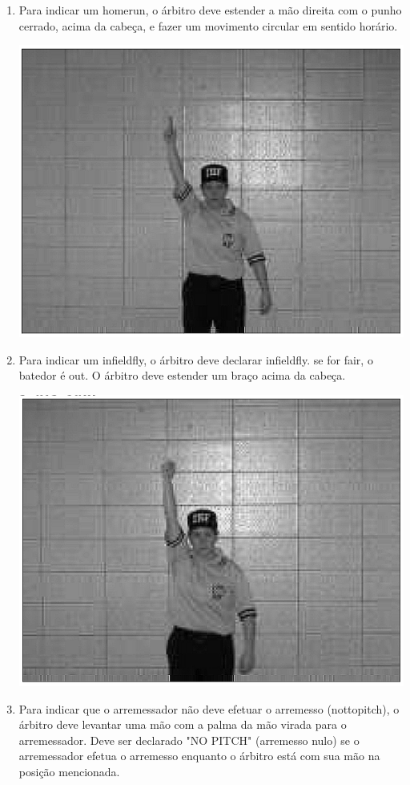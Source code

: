 \begin{enumerate}[label=(\alph*)]
	\item Para indicar um \gls{homerun}, o árbitro deve estender a mão direita com o punho cerrado, acima da cabeça, e fazer um movimento circular em sentido horário.

	\includegraphics[height=.20\textheight]{fig/sinais/home-run}


	\item Para indicar um \gls{infieldfly}, o árbitro deve declarar \gls{infieldfly}. se for \gls{fair}, o batedor é \gls{out}. O árbitro deve estender um braço acima da cabeça.

	\includegraphics[height=.20\textheight]{fig/sinais/infield-fly}

	\item Para indicar que o arremessador não deve efetuar o arremesso (\gls{nottopitch}), o árbitro deve levantar uma mão com a palma da mão virada para o arremessador. Deve ser declarado "NO PITCH" (arremesso nulo) se o arremessador efetua o arremesso enquanto o árbitro está com sua mão na posição mencionada.


\end{enumerate}
